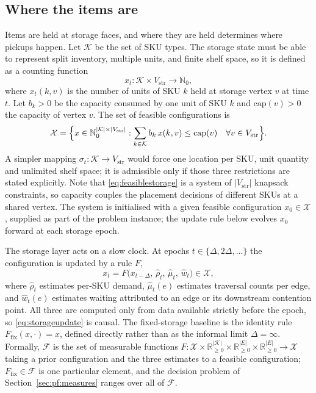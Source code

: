 \documentclass[../main.tex]{subfiles}
\begin{document}
\subsection{Where the items are}
\label{sec:pf:storage}

Items are held at storage faces, and where they are held determines where pickups
happen. Let $\mathcal{K}$ be the set of SKU types. The storage state must be able
to represent split inventory, multiple units, and finite shelf space, so it is
defined as a counting function
\[
  x_t : \mathcal{K} \times V_{\mathrm{str}} \to \mathbb{N}_0 ,
\]
where $x_t(k,v)$ is the number of units of SKU $k$ held at storage vertex $v$ at
time $t$. Let $b_k > 0$ be the capacity consumed by one unit of SKU $k$ and
$\mathrm{cap}(v) > 0$ the capacity of vertex $v$. The set of feasible
configurations is
\begin{equation}
  \mathcal{X} =
  \Bigl\{ x \in \mathbb{N}_0^{|\mathcal{K}| \times |V_{\mathrm{str}}|} :
    \sum_{k \in \mathcal{K}} b_k\, x(k,v) \le \mathrm{cap}(v)
    \quad \forall v \in V_{\mathrm{str}} \Bigr\}.
  \label{eq:feasiblestorage}
\end{equation}
A simpler mapping $\sigma_t : \mathcal{K} \to V_{\mathrm{str}}$ would force one
location per SKU, unit quantity and unlimited shelf space; it is admissible only
if those three restrictions are stated explicitly. Note that
\eqref{eq:feasiblestorage} is a system of $|V_{\mathrm{str}}|$ knapsack
constraints, so capacity couples the placement decisions of different SKUs at a
shared vertex. The system is initialised with a given feasible configuration %
$x_0 \in \mathcal{X}$, supplied as part of the problem instance; the update rule
below evolves $x_0$ forward at each storage epoch.

The storage layer acts on a slow clock. At epochs
$t \in \{\Delta, 2\Delta, \dots\}$ the configuration is updated by a rule $F$,
\begin{equation}
  x_t = F\bigl(x_{t-\Delta},\, \hat{\rho}_t,\, \hat{\mu}_t,\, \hat{w}_t\bigr)
        \in \mathcal{X} ,
  \label{eq:storageupdate}
\end{equation}
where $\hat{\rho}_t$ estimates per-SKU demand, $\hat{\mu}_t(e)$ estimates
traversal counts per edge, and $\hat{w}_t(e)$ estimates waiting attributed to an
edge or its downstream contention point. All three are computed only from data
available strictly before the epoch, so \eqref{eq:storageupdate} is causal. The
fixed-storage baseline is the identity rule $F_{\mathrm{fix}}(x,\cdot) = x$,
defined directly rather than as the informal limit $\Delta = \infty$. Formally, %
$\mathcal{F}$ is the set of measurable functions
$F : \mathcal{X} \times \mathbb{R}_{\ge 0}^{|\mathcal{K}|} \times
\mathbb{R}_{\ge 0}^{|E|} \times \mathbb{R}_{\ge 0}^{|E|} \to \mathcal{X}$ taking a
prior configuration and the three estimates to a feasible configuration;
$F_{\mathrm{fix}} \in \mathcal{F}$ is one particular element, and the decision
problem of Section~\ref{sec:pf:measures} ranges over all of $\mathcal{F}$.
\end{document}
